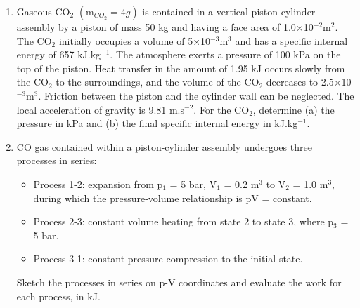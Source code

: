 \documentclass[12pts,a4paper,amsmath,amssymb,floatfix]{article}%
\newcommand{\frc}{\displaystyle\frac}
\begin{document}
\begin{enumerate}[label=\bfseries Problem \arabic*:]
\item\label{Tut01:FirstLawIdealGas3} Gaseous CO$_{2}$ $\left(\text{m}_{CO_{2}}=4g\right)$ is contained in a vertical piston-cylinder assembly by a piston of mass 50 kg and having a face area of 1.0$\times$10$^{-2}$m$^{2}$. The CO$_{2}$ initially occupies a volume of 5$\times$10$^{-3}$m$^{3}$ and has a specific internal energy of 657 kJ.kg$^{-1}$.  The atmosphere exerts a pressure of 100 kPa on the top of the piston. Heat transfer in the amount  of 1.95 kJ occurs slowly from the CO$_{2}$ to the surroundings, and the volume of the CO$_{2}$ decreases to 2.5$\times$10$^{-3}$m$^{3}$. Friction between the piston and the cylinder wall can be neglected. The local acceleration of gravity is 9.81 m.s$^{-2}$. For the CO$_{2}$, determine (a) the pressure in kPa and (b) the final specific internal energy in kJ.kg$^{-1}$.

\item\label{Tut01:FirstLawIdealGas3} CO gas contained within a piston-cylinder assembly undergoes three processes in series:
    \begin{itemize}
       \item Process 1-2: expansion from p$_{1}$ = 5 bar, V$_{1}$ = 0.2 m$^{3}$ to V$_{2}$ = 1.0 m$^{3}$, during which the pressure-volume relationship is pV = constant.
       \item Process 2-3: constant volume heating from state 2 to state 3, where p$_{3}$ = 5 bar.
       \item Process 3-1: constant pressure compression to the initial state.
    \end{itemize}
       Sketch the processes in series on p-V coordinates and evaluate the work for each process, in kJ.

\end{enumerate}
\end{document}
